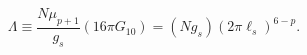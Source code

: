 \begin{equation}\label{constant_convention}
\Lambda\equiv {\frac{N\mu_{p+1}}{g_{s}}} (16\pi G_{10}) =
(Ng_{s})(2\pi\ell_s)^{6-p}.
\end{equation}

